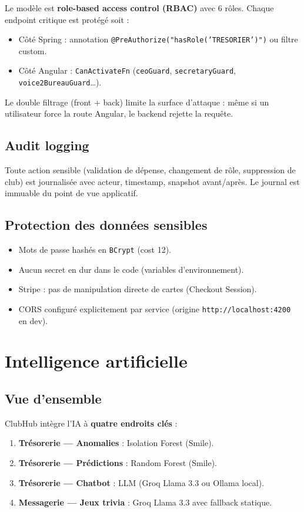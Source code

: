 \documentclass[11pt,a4paper]{report}
\begin{document}
Le modèle est \textbf{role-based access control (RBAC)} avec 6 rôles.
Chaque endpoint critique est protégé soit :
\begin{itemize}
  \item Côté Spring : annotation \texttt{@PreAuthorize("hasRole('TRESORIER')")}
        ou filtre custom.
  \item Côté Angular : \texttt{CanActivateFn} (\texttt{ceoGuard},
        \texttt{secretaryGuard}, \texttt{voice2BureauGuard}\ldots).
\end{itemize}

Le double filtrage (front + back) limite la surface d'attaque : même si un
utilisateur force la route Angular, le backend rejette la requête.

\section{Audit logging}

Toute action sensible (validation de dépense, changement de rôle, suppression
de club) est journalisée avec acteur, timestamp, snapshot avant/après.
Le journal est immuable du point de vue applicatif.

\section{Protection des données sensibles}
\begin{itemize}
  \item Mots de passe hashés en \texttt{BCrypt} (cost 12).
  \item Aucun secret en dur dans le code (variables d'environnement).
  \item Stripe : pas de manipulation directe de cartes (Checkout Session).
  \item CORS configuré explicitement par service (origine
        \texttt{http://localhost:4200} en dev).
\end{itemize}


\chapter{Intelligence artificielle}

\section{Vue d'ensemble}

ClubHub intègre l'IA à \textbf{quatre endroits clés} :
\begin{enumerate}
  \item \textbf{Trésorerie — Anomalies} : Isolation Forest (Smile).
  \item \textbf{Trésorerie — Prédictions} : Random Forest (Smile).
  \item \textbf{Trésorerie — Chatbot} : LLM (Groq Llama 3.3 ou Ollama local).
  \item \textbf{Messagerie — Jeux trivia} : Groq Llama 3.3 avec fallback statique.
\end{enumerate}
\end{document}
